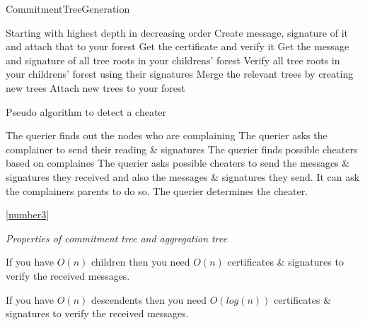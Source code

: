 \begin{algorithm}[H]\label{number3} \caption {CommitmentTreeGeneration}
	\begin {algorithmic}[1]
		\STATE Starting with highest depth in decreasing order 
				\STATE Create message, signature of it and attach that to your forest
								\STATE Get the certificate and verify it
							\ELSE
								\STATE Get the message and signature of all tree roots in your childrens' forest
								\STATE Verify all tree roots in your childrens' forest using their signatures 
									\STATE Merge the relevant trees by creating new trees
									\STATE Attach new trees to your forest
								\ENDIF
							\ENDIF
						\ENDFOR
					\ENDIF
			\ENDFOR
	\end{algorithmic}
\end{algorithm}

\begin{algorithm}
\caption{Pseudo algorithm to detect a cheater}
	\begin{algorithmic}[1]
			\STATE The querier finds out the nodes who are complaining 
			\STATE The querier asks the complainer to send their reading \& signatures
			\STATE The querier finds possible cheaters based on complaines
			\STATE The querier asks possible cheaters to send the messages \& signatures they received and also the messages \& signatures they send. It can ask the complainers parents to do so.
			\STATE The querier determines the cheater. 
	\end{algorithmic}
\end{algorithm}

\ref{number3}

\textit{Properties of commitment tree and aggregation tree}

	If you have $O(n)$ children then you need $O(n)$ certificates \& signatures to verify the received messages.

	If you have $O(n)$ descendents then you need $O(log(n))$ certificates \& signatures to verify the received messages.
